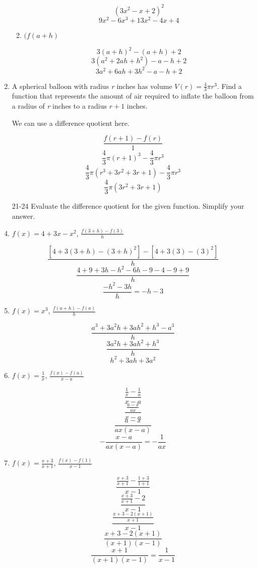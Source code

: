 \documentclass{article}
\begin{document}
\begin{enumerate}
\begin{enumerate}
					$$ (3x^2 - x + 2)^2$$
					$$9x^2 - 6x^3 + 13x^2 - 4x + 4$$
					
				\item $(f(a + h)$
					
					$$3(a + h)^2 - (a + h) + 2 $$
					$$3(a^2 + 2ah + h^2) - a - h + 2 $$
					$$3a^2 + 6ah + 3h^2 - a - h + 2 $$
			\end{enumerate}
			
			\item A spherical balloon with radius \emph{r} inches has volume $V(r) = \frac{4}{3}\pi  r^3$.
				Find a function that represents the amount of air required to inflate the balloon from a
				radius of \emph{r} inches to a radius $r + 1$ inches.
				
				We can use a difference quotient here.
				
				$$\frac{f(r + 1) - f(r)}{1}$$
				$$\frac{4}{3}\pi (r + 1)^3 - \frac{4}{3}\pi r^3$$
				$$\frac{4}{3}\pi (r^3 + 3r^2 + 3r + 1) - \frac{4}{3} \pi r^3$$
				$$\frac{4}{3} \pi (3r^2 + 3r + 1) $$
				
			\item[21-24] Evaluate the difference quotient for the given function. Simplify your answer.
			
		
			\item $f(x) = 4 + 3x - x^2$, $\frac{f(3 + h) - f(3)}{h}$

				$$\frac{[4 + 3(3 + h) - (3 + h)^2] - [4 + 3(3) - (3)^2]}{h}$$
				$$\frac{4 + 9 + 3h - h^2 - 6h - 9 - 4 - 9 + 9}{h}$$
				$$\frac{-h^2 - 3h}{h} = - h - 3$$

			\item $f(x) = x^3$, $\frac{f(a+h) - f(a)}{h}$

				$$\frac{a^3 + 3a^2h + 3ah^2 + h^3 - a^3}{h}$$
				$$\frac{3a^2h + 3ah^2 + h^3}{h}$$
				$$h^2 + 3ah + 3a^2$$

			\item $f(x) = \frac{1}{x}$, $\frac{f(x) - f(a)}{x - a}$

				$$\frac{\frac{1}{x}- \frac{1}{a}}{x-a}$$
				$$\frac{\frac{a-x}{ax}}{x - a}$$
				$$\frac{a - x}{ax(x-a)}$$
				$$-\frac{x-a}{ax(x - a)} = - \frac{1}{ax}$$

			\item $f(x) = \frac{x + 3}{x + 1}$, $\frac{f(x) - f(1)}{x - 1}$

				$$ \frac{ \frac{x + 3}{x + 1} - \frac{1 + 3}{1 + 1}}{x - 1} $$
				$$ \frac{ \frac{x + 3}{x +1} - 2}{x-1} $$
				$$ \frac{ \frac{x + 3 - 2(x + 1)}{x + 1}}{x - 1} $$
				$$ \frac{x + 3 - 2(x + 1)}{(x + 1)(x - 1)} $$
				$$ \frac{x + 1}{(x + 1)(x - 1)} = \frac{1}{x - 1} $$
	\end{enumerate}
\end{document}
